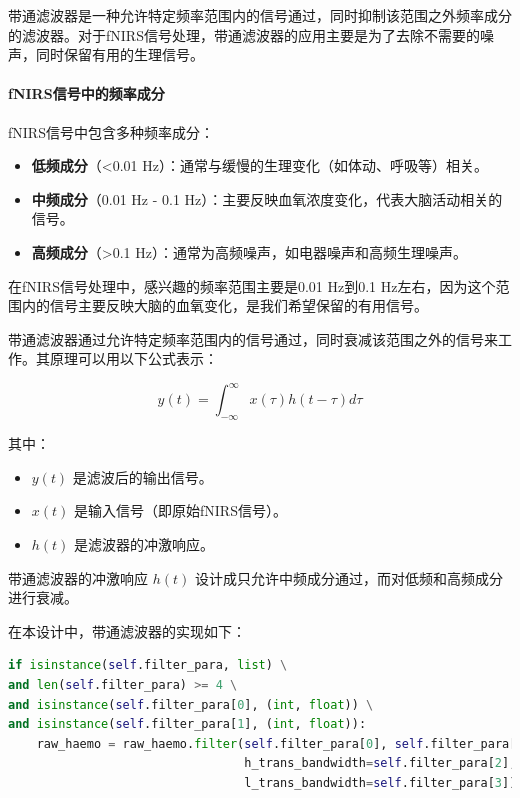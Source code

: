 \documentclass[a4paper,12pt]{article}
\begin{document}
带通滤波器是一种允许特定频率范围内的信号通过，同时抑制该范围之外频率成分的滤波器。对于fNIRS信号处理，带通滤波器的应用主要是为了去除不需要的噪声，同时保留有用的生理信号。

\paragraph{fNIRS信号中的频率成分}

fNIRS信号中包含多种频率成分：
\begin{itemize}
    \item \textbf{低频成分}（<0.01 Hz）：通常与缓慢的生理变化（如体动、呼吸等）相关。
    \item \textbf{中频成分}（0.01 Hz - 0.1 Hz）：主要反映血氧浓度变化，代表大脑活动相关的信号。
    \item \textbf{高频成分}（>0.1 Hz）：通常为高频噪声，如电器噪声和高频生理噪声。
\end{itemize}

在fNIRS信号处理中，感兴趣的频率范围主要是0.01 Hz到0.1 Hz左右，因为这个范围内的信号主要反映大脑的血氧变化，是我们希望保留的有用信号。

带通滤波器通过允许特定频率范围内的信号通过，同时衰减该范围之外的信号来工作。其原理可以用以下公式表示：

\begin{equation}
y(t) = \int_{-\infty}^{\infty} x(\tau) h(t-\tau) d\tau
\end{equation}

其中：
\begin{itemize}
    \item \( y(t) \) 是滤波后的输出信号。
    \item \( x(t) \) 是输入信号（即原始fNIRS信号）。
    \item \( h(t) \) 是滤波器的冲激响应。
\end{itemize}

带通滤波器的冲激响应 \( h(t) \) 设计成只允许中频成分通过，而对低频和高频成分进行衰减。

在本设计中，带通滤波器的实现如下：

\begin{lstlisting}[language=python]
if isinstance(self.filter_para, list) \
and len(self.filter_para) >= 4 \
and isinstance(self.filter_para[0], (int, float)) \
and isinstance(self.filter_para[1], (int, float)):
    raw_haemo = raw_haemo.filter(self.filter_para[0], self.filter_para[1], 
                                 h_trans_bandwidth=self.filter_para[2], 
                                 l_trans_bandwidth=self.filter_para[3])
\end{lstlisting}
\end{document}
